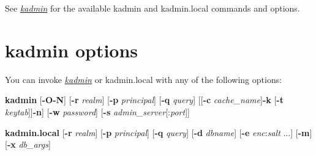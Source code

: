 \documentclass[letterpaper,10pt,english]{sphinxmanual}
\begin{document}
See {\hyperref[admin/admin_commands/kadmin_local:kadmin-1]{\emph{kadmin}}} for the available kadmin and kadmin.local
commands and options.


\section{kadmin options}
\label{admin/database:kadmin-options}
You can invoke {\hyperref[admin/admin_commands/kadmin_local:kadmin-1]{\emph{kadmin}}} or kadmin.local with any of the
following options:

\textbf{kadmin}
{[}\textbf{-O}\textbar{}\textbf{-N}{]}
{[}\textbf{-r} \emph{realm}{]}
{[}\textbf{-p} \emph{principal}{]}
{[}\textbf{-q} \emph{query}{]}
{[}{[}\textbf{-c} \emph{cache\_name}{]}\textbar{}{[}\textbf{-k} {[}\textbf{-t} \emph{keytab}{]}{]}\textbar{}\textbf{-n}{]}
{[}\textbf{-w} \emph{password}{]}
{[}\textbf{-s} \emph{admin\_server}{[}:\emph{port}{]}{]}

\textbf{kadmin.local}
{[}\textbf{-r} \emph{realm}{]}
{[}\textbf{-p} \emph{principal}{]}
{[}\textbf{-q} \emph{query}{]}
{[}\textbf{-d} \emph{dbname}{]}
{[}\textbf{-e} \emph{enc}:\emph{salt} ...{]}
{[}\textbf{-m}{]}
{[}\textbf{-x} \emph{db\_args}{]}
\end{document}
